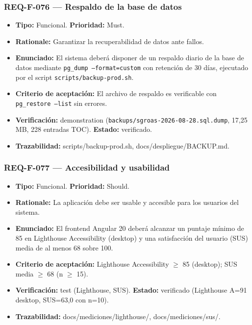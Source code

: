 \documentclass[12pt,a4paper]{article}
\begin{document}
\subsubsection{REQ-F-076 --- Respaldo de la base de datos}
\begin{itemize}
  \item \textbf{Tipo:} Funcional. \textbf{Prioridad:} Must.
  \item \textbf{Rationale:} Garantizar la recuperabilidad de datos ante fallos.
  \item \textbf{Enunciado:} El sistema deberá disponer de un respaldo diario de la base de datos mediante \texttt{pg\_dump --format=custom} con retención de 30 días, ejecutado por el script \texttt{scripts/backup-prod.sh}.
  \item \textbf{Criterio de aceptación:} El archivo de respaldo es verificable con \texttt{pg\_restore --list} sin errores.
  \item \textbf{Verificación:} demonstration (\texttt{backups/sgroas-2026-08-28.sql.dump}, 17,25 MB, 228 entradas TOC). \textbf{Estado:} verificado.
  \item \textbf{Trazabilidad:} scripts/backup-prod.sh, docs/despliegue/BACKUP.md.
\end{itemize}

\subsubsection{REQ-F-077 --- Accesibilidad y usabilidad}
\begin{itemize}
  \item \textbf{Tipo:} Funcional. \textbf{Prioridad:} Should.
  \item \textbf{Rationale:} La aplicación debe ser usable y accesible para los usuarios del sistema.
  \item \textbf{Enunciado:} El frontend Angular 20 deberá alcanzar un puntaje mínimo de 85 en Lighthouse Accessibility (desktop) y una satisfacción del usuario (SUS) media de al menos 68 sobre 100.
  \item \textbf{Criterio de aceptación:} Lighthouse Accessibility $\ge$ 85 (desktop); SUS media $\ge$ 68 (n $\ge$ 15).
  \item \textbf{Verificación:} test (Lighthouse, SUS). \textbf{Estado:} verificado (Lighthouse A=91 desktop, SUS=63,0 con n=10).
  \item \textbf{Trazabilidad:} docs/mediciones/lighthouse/, docs/mediciones/sus/.
\end{itemize}
\end{document}
